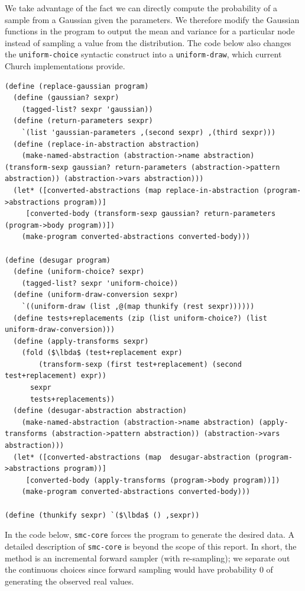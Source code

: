 \documentclass[a4paper,10pt]{article}
\newcommand{\lbda}{\color[rgb]{0,.3,.7} \lambda}
\begin{document}
We take advantage of the fact we can directly compute the probability of a sample from a Gaussian given the parameters.  We therefore modify the Gaussian functions in the program to output the mean and variance for a particular node instead of sampling a value from the distribution.  The code below also changes the \texttt{uniform-choice} syntactic construct into a \texttt{uniform-draw}, which current Church implementations provide.
\begin{lstlisting}[frame=trbl]
(define (replace-gaussian program)
  (define (gaussian? sexpr)
    (tagged-list? sexpr 'gaussian))
  (define (return-parameters sexpr)
    `(list 'gaussian-parameters ,(second sexpr) ,(third sexpr)))
  (define (replace-in-abstraction abstraction)
    (make-named-abstraction (abstraction->name abstraction) (transform-sexp gaussian? return-parameters (abstraction->pattern abstraction)) (abstraction->vars abstraction)))
  (let* ([converted-abstractions (map replace-in-abstraction (program->abstractions program))]
	 [converted-body (transform-sexp gaussian? return-parameters (program->body program))])
    (make-program converted-abstractions converted-body)))

(define (desugar program)
  (define (uniform-choice? sexpr)
    (tagged-list? sexpr 'uniform-choice))
  (define (uniform-draw-conversion sexpr)
    `((uniform-draw (list ,@(map thunkify (rest sexpr))))))
  (define tests+replacements (zip (list uniform-choice?) (list uniform-draw-conversion)))
  (define (apply-transforms sexpr)
    (fold ($\lbda$ (test+replacement expr)
	    (transform-sexp (first test+replacement) (second test+replacement) expr))
	  sexpr
	  tests+replacements))
  (define (desugar-abstraction abstraction)
    (make-named-abstraction (abstraction->name abstraction) (apply-transforms (abstraction->pattern abstraction)) (abstraction->vars abstraction)))
  (let* ([converted-abstractions (map  desugar-abstraction (program->abstractions program))]
	 [converted-body (apply-transforms (program->body program))])
    (make-program converted-abstractions converted-body)))

(define (thunkify sexpr) `($\lbda$ () ,sexpr))
\end{lstlisting}
In the code below, \texttt{smc-core} forces the program to generate the desired data.  A detailed description of \texttt{smc-core} is beyond the scope of this report. In short, the method is an incremental forward sampler (with re-sampling); we separate out the continuous choices since forward sampling would have probability $0$ of generating the observed real values.
\end{document}

